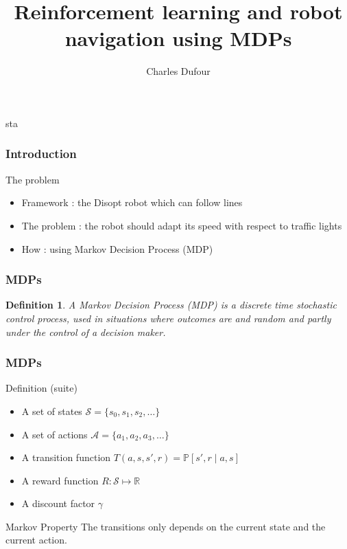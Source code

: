 sta\documentclass[dvipsnames,svgnames]{beamer}
\author{Charles Dufour}
\title{Reinforcement learning and robot navigation using MDPs}
\newtheorem{madef}{Definition}
\begin{document}
\begin{frame}
\titlepage
\end{frame}




\begin{frame}
\frametitle{Introduction}
\begin{block}{The problem}

  \begin{itemize}
   \item Framework : the Disopt robot which can follow lines
   \item The problem : the robot should adapt its speed with           respect to traffic lights
   \item How : using Markov Decision Process (MDP)
  \end{itemize}
\end{block} 
\end{frame}


\begin{frame}
\frametitle{MDPs}
\begin{madef}
A Markov Decision Process (MDP) is a discrete time stochastic control process, used in situations where outcomes are and random and partly under the control of a decision maker. 

\end{madef}
\end{frame}

\begin{frame}
\frametitle{MDPs}
\begin{block}{Definition (suite)}
\begin{itemize}
\item A set of states $\mathcal{S}=\{s_0,s_1,s_2,\ldots\}$
\item A set of actions $\mathcal{A}=\{a_1,a_2,a_3,\ldots\}$
\item A transition function $T(a,s,s',r) = \mathbb{P}[s',r\mid a,s]$
\item A reward function $R: \mathcal{S}\mapsto \mathbb{R}$
\item A discount factor $\gamma$ 
\end{itemize}
\end{block}

\begin{block}{Markov Property}
The transitions only depends on the current state and the current action.
\end{block}
\end{frame}
\end{document}

